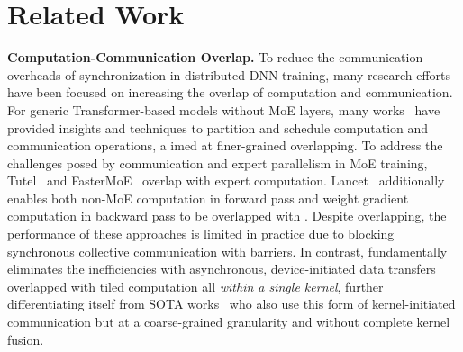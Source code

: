 \section{Related Work}
\label{sec:related}
\noindent\textbf{Computation-Communication Overlap.}
To reduce the communication overheads of synchronization in distributed DNN training, many research efforts have been focused on
increasing the overlap of computation and communication.
For generic Transformer-based models without MoE layers,
many works~\cite{coconet,decomposition,centauri,t3,megascale,co2,syndicate,ccfuser,fused}
have provided insights and techniques to
partition and schedule computation and communication operations, a
imed at finer-grained overlapping.
To address the challenges posed by \alltoall communication and
expert parallelism in MoE training, Tutel~\cite{tutel} and FasterMoE~\cite{fastermoe}
overlap \alltoall with expert computation.
Lancet~\cite{lancet} additionally enables both non-MoE computation in
forward pass and weight gradient computation in backward pass to be overlapped with \alltoall.
Despite overlapping, the performance of these approaches is
limited in practice due to blocking synchronous collective communication with barriers.
In contrast, \sysname fundamentally
eliminates the inefficiencies with
asynchronous, device-initiated data transfers overlapped with tiled computation
all \emph{within a single kernel},
further differentiating itself from SOTA works~\cite{triton-dist, comet, deepep}
who also use this form of kernel-initiated communication but at a coarse-grained granularity
and without complete kernel fusion.

